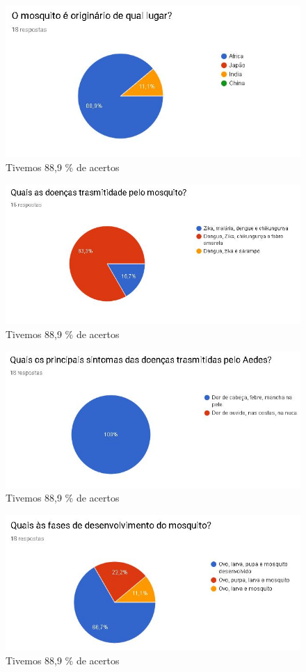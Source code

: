 \documentclass[12pt]{article}
\begin{document}
	\begin{figure}[H]
		\centering
		\caption{Tivemos 88,9 \% de acertos}
		\includegraphics[width=0.7\linewidth]{Figuras/Pergunta_2}
		
		\label{fig:pergunta2}
	\end{figure}
	
	\begin{figure}[H]
		\centering
		\caption{Tivemos 88,9 \% de acertos}
		\includegraphics[width=0.7\linewidth]{Figuras/Pergunta_3}
		
		\label{fig:pergunta3}
	\end{figure}
	
	\begin{figure}[H]
		\centering
		\caption{Tivemos 88,9 \% de acertos}
		\includegraphics[width=0.7\linewidth]{Figuras/Pergunta_4}
		
		\label{fig:pergunta4}
	\end{figure}
	
	\begin{figure}[H]
		\centering
		\caption{Tivemos 88,9 \% de acertos}
		\includegraphics[width=0.7\linewidth]{Figuras/Pergunta_5}
		
		\label{fig:pergunta5}
	\end{figure}
	
\end{document}
